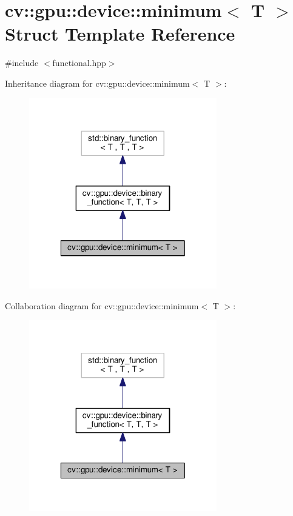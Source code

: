 \hypertarget{structcv_1_1gpu_1_1device_1_1minimum}{\section{cv\-:\-:gpu\-:\-:device\-:\-:minimum$<$ T $>$ Struct Template Reference}
\label{structcv_1_1gpu_1_1device_1_1minimum}
}


{\ttfamily \#include $<$functional.\-hpp$>$}



Inheritance diagram for cv\-:\-:gpu\-:\-:device\-:\-:minimum$<$ T $>$\-:\nopagebreak
\begin{figure}[H]
\begin{center}
\leavevmode
\includegraphics[width=232pt]{structcv_1_1gpu_1_1device_1_1minimum__inherit__graph}
\end{center}
\end{figure}


Collaboration diagram for cv\-:\-:gpu\-:\-:device\-:\-:minimum$<$ T $>$\-:\nopagebreak
\begin{figure}[H]
\begin{center}
\leavevmode
\includegraphics[width=232pt]{structcv_1_1gpu_1_1device_1_1minimum__coll__graph}
\end{center}
\end{figure}
